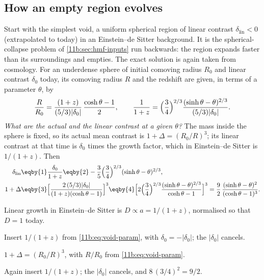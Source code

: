 \subsection{How an empty region evolves}
\label{11b:sec:void-evolution}

Start with the simplest void, a uniform spherical region of linear contrast
$\delta_{\mathrm{lin}}<0$ (extrapolated to today) in an Einstein--de Sitter
background. It is the spherical-collapse problem of \cref{11b:sec:hmf-inputs} run
backwards: the region expands faster than its surroundings and empties. The exact
solution is again taken from cosmology. For an underdense sphere of initial
comoving radius $R_0$ and linear contrast $\delta_0$ today, its comoving radius
$R$ and the redshift are given, in terms of a parameter $\theta$, by
\begin{equation}
  \frac{R}{R_0}=\frac{(1+z)}{(5/3)|\delta_0|}\,\frac{\cosh\theta-1}{2},
  \qquad
  \frac{1}{1+z}=\Bigl(\frac34\Bigr)^{2/3}\frac{(\sinh\theta-\theta)^{2/3}}{(5/3)|\delta_0|}.
  \label{11b:eq:void-param}
\end{equation}
\emph{What are the actual and the linear contrast at a given $\theta$?} The mass
inside the sphere is fixed, so its actual mean contrast is
$1+\Delta=(R_0/R)^3$; its linear contrast at that time is $\delta_0$ times the
growth factor, which in Einstein--de Sitter is $1/(1+z)$. Then
\begin{align}
  \delta_{\mathrm{lin}}
  &\eqby{1}\frac{\delta_0}{1+z}
   \eqby{2}-\frac35\Bigl(\frac34\Bigr)^{2/3}(\sinh\theta-\theta)^{2/3},\nonumber\\
  1+\Delta
  &\eqby{3}\Bigl[\frac{2\,(5/3)|\delta_0|}{(1+z)(\cosh\theta-1)}\Bigr]^3
   \eqby{4}\Bigl[2\Bigl(\frac34\Bigr)^{2/3}
     \frac{(\sinh\theta-\theta)^{2/3}}{\cosh\theta-1}\Bigr]^3
   =\frac92\,\frac{(\sinh\theta-\theta)^2}{(\cosh\theta-1)^3}.
  \label{11b:eq:void-curve}
\end{align}
\begin{explain}
  \item Linear growth in Einstein--de Sitter is $D\propto a=1/(1+z)$, normalised
        so that $D=1$ today.
  \item Insert $1/(1+z)$ from \eqref{11b:eq:void-param}, with $\delta_0=-|\delta_0|$;
        the $|\delta_0|$ cancels.
  \item $1+\Delta=(R_0/R)^3$, with $R/R_0$ from \eqref{11b:eq:void-param}.
  \item Again insert $1/(1+z)$; the $|\delta_0|$ cancels, and
        $8\,(3/4)^2=9/2$.
\end{explain}
